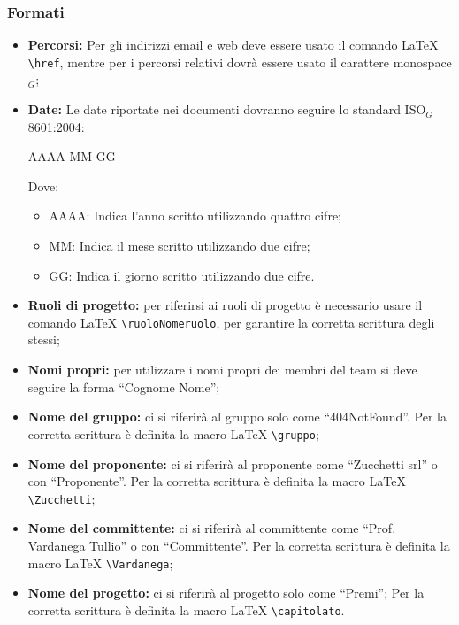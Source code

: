 \subsubsection{Formati}
\begin{itemize}
\item \textbf{Percorsi:} Per gli indirizzi email e web deve essere usato il comando \LaTeX{} \verb|\href|, mentre per i percorsi relativi dovrà essere usato il carattere monospace$_G$;
\item \textbf{Date:} Le date riportate nei documenti dovranno seguire lo standard ISO$_G$ 8601:2004:
\begin{center}
AAAA-MM-GG
\end{center}
Dove:
\begin{itemize}
\item AAAA: Indica l'anno scritto utilizzando quattro cifre;
\item MM: Indica il mese scritto utilizzando due cifre;
\item GG: Indica il giorno scritto utilizzando due cifre.
\end{itemize}
\item \textbf{Ruoli di progetto:} per riferirsi ai ruoli di progetto è necessario usare il comando \LaTeX{} \verb|\ruoloNomeruolo|, per garantire la corretta scrittura degli stessi;
\item \textbf{Nomi propri:} per utilizzare i nomi propri dei membri del team si deve seguire la forma ``Cognome Nome'';
\item \textbf{Nome del gruppo:} ci si riferirà al gruppo solo come ``404NotFound''. Per la corretta scrittura è definita la macro \LaTeX{} \verb|\gruppo|;
\item \textbf{Nome del proponente:} ci si riferirà al proponente come ``Zucchetti srl'' o con ``Proponente''. Per la corretta scrittura è definita la macro \LaTeX{} \verb|\Zucchetti|;
\item \textbf{Nome del committente:} ci si riferirà al committente come ``Prof. Vardanega Tullio'' o con ``Committente''. Per la corretta scrittura è definita la macro \LaTeX{} \verb|\Vardanega|;
\item \textbf{Nome del progetto:} ci si riferirà al progetto solo come ``Premi''; Per la corretta scrittura è definita la macro \LaTeX{} \verb|\capitolato|.
\end{itemize}

